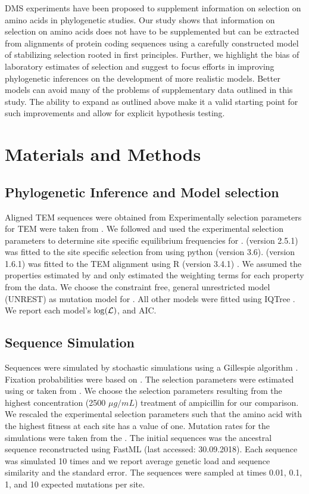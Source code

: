 DMS experiments have been proposed to supplement information on selection on amino acids in phylogenetic studies.
Our study shows that information on selection on amino acids does not have to be supplemented but can be extracted from alignments of protein coding sequences using a carefully constructed model of stabilizing selection rooted in first principles.
Further, we highlight the bias of laboratory estimates of selection and suggest to focus efforts in improving phylogenetic inferences on the development of more realistic models.
Better models can avoid many of the problems of supplementary data outlined in this study.
The ability to expand \selac as outlined above make it a valid starting point for such improvements and allow for explicit hypothesis testing.


\section{Materials and Methods}

\subsection{Phylogenetic Inference and Model selection}

Aligned TEM sequences were obtained from \citet{bloom2017}
Experimentally selection parameters for TEM were taken from \citet{stiffler2016}.
We followed \citep{bloom2017} and used the experimental selection parameters to determine site specific equilibrium frequencies for \phydms. 
\phydms (version 2.5.1) was fitted to the site specific selection from \citet{stiffler2016} using python (version 3.6).
\selac (version 1.6.1) was fitted to the TEM alignment using R (version 3.4.1) \citep{rcore}.
We assumed the \PC properties estimated by \citet{grantham1974} and only estimated the weighting terms for each property from the data.
We choose the constraint free, general unrestricted model (UNREST) \citep{Yang1994} as mutation model for \selac.
All other models were fitted using IQTree \citep{nguyen2015}.
We report each model's $\log(\mathcal{L})$, and AIC.

\subsection{Sequence Simulation}

Sequences were simulated by stochastic simulations using a Gillespie algorithm \citep{gillespie1976}.
Fixation probabilities were based on \citet{SellaAndHirsh2005}.
The selection parameters were estimated using \selac or taken from \citet{stiffler2016}.
We choose the selection parameters resulting from the highest concentration (2500 $\mu g/mL$) treatment of ampicillin for our comparison.
We rescaled the experimental selection parameters such that the amino acid with the highest fitness at each site has a value of one.
Mutation rates for the simulations were taken from the \selac.
The initial sequences was the ancestral sequence reconstructed using FastML \citep{fastml} (last accessed: 30.09.2018).
Each sequence was simulated 10 times and we report average genetic load and sequence similarity and the standard error.
The sequences were sampled at times 0.01, 0.1, 1, and 10 expected mutations per site.

